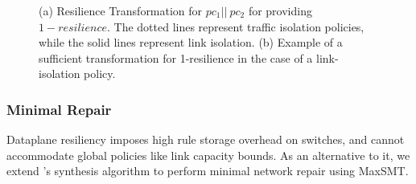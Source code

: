 \begin{figure}
	\centering
	\caption{\label{fig:restransform}
		(a) Resilience Transformation for $pc_1 || \ pc_2$ for providing $1-resilience$. 
		The dotted lines represent traffic isolation policies, 
		while the solid lines represent link isolation. (b) Example of a sufficient transformation
		for 1-resilience in the case of a link-isolation policy.}
\end{figure}


\subsubsection{Minimal Repair} \label{sec:repair}

Dataplane resiliency imposes high rule storage overhead on switches,
and cannot accommodate global policies like link capacity bounds. 
As an alternative to it, we
extend \name's synthesis algorithm to perform minimal network
repair using MaxSMT.

